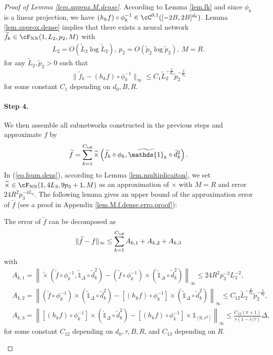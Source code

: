 \documentclass[11pt]{article} %
\begin{document}
\begin{proof}[Proof of Lemma \ref{lem.approx.M.dense}]
	According to Lemma \ref{lem.fk} and since $\phi_k$ is a linear projection, we have  $(h_kf)\circ \phi_k^{-1}\in \cC^{0,1}([-2B,2B]^{d_0})$. Lemma \ref{lem.approx.dense} implies that there exists a neural network $\widetilde{f}_k\in \cF_{\rm NN}(1,L_2,p_2,M)$ with
	\begin{align*}
		L_2=O(\widetilde{L}_2\log \widetilde{L}_2), \ p_2=O\left(\widetilde{p}_2\log \widetilde{p}_2\right),\ M=R.
	\end{align*}
	for any $\widetilde{L}_2,\widetilde{p}_2>0$
	such that 
	$$
	\|\widetilde{f}_k-(h_kf)\circ \phi_k^{-1}\|_{\infty}\leq C_1\widetilde{L}_2^{-\frac{2}{d_0}}\widetilde{p}_2^{-\frac{2}{d_0}}
	$$
	for some constant $C_1$ depending on $d_0,B,R$. 
	
	\paragraph{Step 4.} We then assemble all subnetworks constructed in the previous steps and approximate $f$ by
	\begin{align}
		\widetilde{f}=\sum_{k=1}^{C_{\cM}} \widetilde{\times}\left( \widetilde{f}_k\circ \phi_k, \widetilde{\mathds{1}}_k\circ \widetilde{d}_k^2 \right).
		\label{eq.fsum.dens}
	\end{align}
	In (\ref{eq.fsum.dens}), according to Lemma \ref{lem.multiplicaiton}, we set $\widetilde{\times}\in \cF_{\rm NN}(1,4L_3,9p_3+1,M)$ as an approximation of $\times$ with $M=R$ and error $24R^2p_3^{-4L_3}$.
	The following lemma gives an upper bound of the approximation error of $\widetilde{f}$ (see a proof in Appendix \ref{lem.M.f.dense.erro.proof}):
	\begin{lemma}\label{lem.M.f.dense.erro}
		The error of $\widetilde{f}$ can be decomposed as
		\begin{align*}
			\|\widetilde{f}-f\|_{\infty}\leq \sum_{k=1}^{C_{\cM}} A_{k,1}+A_{k,2}+A_{k,3}
		\end{align*}
		with
		\begin{align*}
			&A_{k,1}=\left\|\widetilde{\times}(\widetilde{f}\circ \phi_k^{-1},\widetilde{\mathds{1}}_{\Delta}\circ \widetilde{d}_k^2)-(\widetilde{f}\circ \phi_k^{-1})\times (\widetilde{\mathds{1}}_{\Delta}\circ \widetilde{d}_k^2)\right\|_{\infty}\leq 24R^2p_3^{-2}L_3^{-2},\\
			&A_{k,2}=\left\|(\widetilde{f}\circ \phi_k^{-1})\times (\widetilde{\mathds{1}}_{\Delta}\circ \widetilde{d}_k^2)-[(h_kf)\circ \phi_k^{-1}]\times (\widetilde{\mathds{1}}_{\Delta}\circ \widetilde{d}_k^2)\right\|_{\infty}\leq C_{12}\widetilde{L}_2^{-\frac{2}{d_0}}\widetilde{p}_2^{-\frac{2}{d_0}},\\
			&A_{k,3}=\left\|[(h_kf)\circ \phi_k^{-1}]\times (\widetilde{\mathds{1}}_{\Delta}\circ \widetilde{d}_k^2)-[(h_kf)\circ \phi_k^{-1}]\times \mathds{1}_{[0,r^2]}\right\|_{\infty}\leq \frac{C_{13}(\pi+1)}{r(1-r/\tau)}\Delta,
		\end{align*}
		for some constant $C_{12}$ depending on $d_0,\tau,B,R$, and $C_{13}$ depending on $R$.
	\end{lemma}
	

\end{proof}
\end{document}
